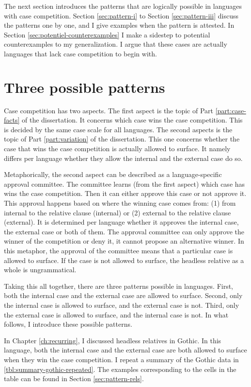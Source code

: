 The next section introduces the patterns that are logically possible in languages with case competition. Section \ref{sec:pattern-i} to Section \ref{sec:pattern-iii} discuss the patterns one by one, and I give examples when the pattern is attested. In Section \ref{sec:potentiel-counterexamples} I make a sidestep to potential counterexamples to my generalization. I argue that these cases are actually languages that lack case competition to begin with.


\section{Three possible patterns}\label{sec:possible-patterns}

Case competition has two aspects. The first aspect is the topic of Part \ref{part:case-facts} of the dissertation. It concerns which case wins the case competition. This is decided by the same case scale for all languages. The second aspects is the topic of Part \ref{part:variation} of the dissertation. This one concerns whether the case that wins the case competition is actually allowed to surface. It namely differs per language whether they allow the internal and the external case do so.

Metaphorically, the second aspect can be described as a language-specific approval committee. The committee learns (from the first aspect) which case has wins the case competition. Then it can either approve this case or not approve it. This approval happens based on where the winning case comes from: (1) from internal to the relative clause (internal) or (2) external to the relative clause (external). It is determined per language whether it approves the internal case, the external case or both of them. The approval committee can only approve the winner of the competition or deny it, it cannot propose an alternative winner. In this metaphor, the approval of the committee means that a particular case is allowed to surface. If the case is not allowed to surface, the headless relative as a whole is ungrammatical.

Taking this all together, there are three patterns possible in languages. First, both the internal case and the external case are allowed to surface. Second, only the internal case is allowed to surface, and the external case is not. Third, only the external case is allowed to surface, and the internal case is not. In what follows, I introduce these possible patterns.

In Chapter \ref{ch:recurring}, I discussed headless relatives in Gothic. In this language, both the internal case and the external case are both allowed to surface when they win the case competition. I repeat a summary of the Gothic data in \ref{tbl:summary-gothic-repeated}. The examples corresponding to the cells in the table can be found in Section \ref{sec:pattern-rels}.

